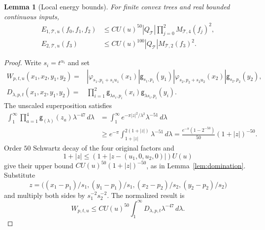 \documentclass[12pt,reqno]{amsart}
\theoremstyle{plain}
\newtheorem{lemma}[theorem]{Lemma}
\theoremstyle{definition}
\theoremstyle{remark}
\numberwithin{equation}{section}
\newcommand{\T}{\mathcal T}
\newcommand{\g}{\mathsf g}
\newcommand{\dd}{\,d}
\begin{document}
\begin{lemma}[Local energy bounds]\label{lem:local_energies}
For finite convex trees and real bounded continuous inputs,
\begin{align}
 E_{1,\T,u}(f_0,f_1,f_2)&\le C U(u)^{50}|Q_\T|
                              \prod_{j=0}^2M_{\T,4}(f_j)^2,\label{eq:energy1}\\
 E_{2,\T,u}(f_3)&\le C U(u)^{100}|Q_\T|M_{\T,2}(f_3)^2.\label{eq:energy2}
\end{align}
\end{lemma}
\begin{proof}
Write $s_i=t^{\alpha_i}$ and set
\begin{align*}
 W_{p,t,u}(x_1,x_2,y_1,y_2)={}&
 |\varphi_{s_1,p_1+s_1u_1}(x_1)|\g_{s_1,p_1}(y_1)
 |\varphi_{s_2,p_2+s_2u_2}(x_2)|\g_{s_2,p_2}(y_2),\\
 D_{\lambda,p,t}(x_1,x_2,y_1,y_2)={}&
 \prod_{i=1}^2\g_{\lambda s_i,p_i}(x_i)
                         \g_{\lambda s_i,p_i}(y_i).
\end{align*}
The unscaled superposition satisfies
\begin{align*}
 \int_1^\infty\prod_{a=1}^4\g_{(\lambda)}(z_a)
                          \lambda^{-47}\dd\lambda
 &=\int_1^\infty e^{-\pi|z|^2/\lambda^2}\lambda^{-51}\dd\lambda\\
 &\ge e^{-\pi}\int_{1+|z|}^{2(1+|z|)}\lambda^{-51}\dd\lambda
   =\frac{e^{-\pi}(1-2^{-50})}{50}(1+|z|)^{-50}.
\end{align*}
Order $50$ Schwartz decay of the four original factors and
\[
 1+|z|\le (1+|z-(u_1,0,u_2,0)|)U(u)
\]
give their upper bound
$C U(u)^{50}(1+|z|)^{-50}$, as in Lemma~\ref{lem:domination}.
Substitute
\[
 z=\big((x_1-p_1)/s_1,(y_1-p_1)/s_1,
        (x_2-p_2)/s_2,(y_2-p_2)/s_2\big)
\]
and multiply both sides by $s_1^{-2}s_2^{-2}$. The normalized result is
\begin{equation}\label{eq:scaled_superposition}
 W_{p,t,u}\le C U(u)^{50}\int_1^\infty
                     D_{\lambda,p,t}\lambda^{-47}\dd\lambda.
\end{equation}


\end{proof}
\end{document}
